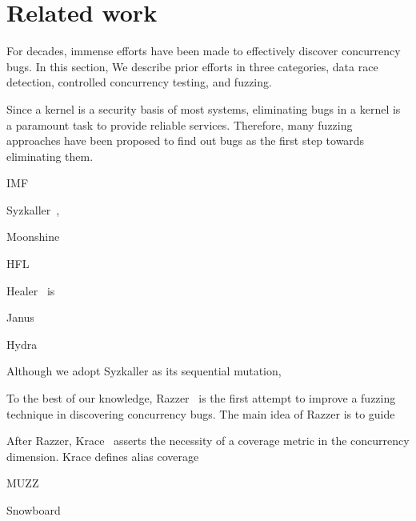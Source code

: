 \section{Related work}
\label{s:relwk}

For decades, immense efforts have been made to effectively discover
concurrency bugs. In this section, We describe prior efforts in three
categories, data race detection, controlled concurrency testing, and
fuzzing.


%

\cite{lkmm, linuxmemorymodel}


%


%
Since a kernel is a security basis of most systems, eliminating bugs
in a kernel is a paramount task to provide reliable
services. Therefore, many fuzzing approaches have been proposed to
find out bugs as the first step towards eliminating them.
%

IMF~\cite{imf}

Syzkaller~\cite{syzkaller},

Moonshine~\cite{moonshine}

HFL~\cite{hfl}

Healer~\cite{healer} is

Janus~\cite{janus}

Hydra~\cite{hydra}


Although we adopt Syzkaller as its sequential mutation, 

%
To the best of our knowledge, Razzer~\cite{razzer} is the first
attempt to improve a fuzzing technique in discovering concurrency
bugs.
%
The main idea of Razzer is to guide


After Razzer, Krace~\cite{krace} asserts the necessity of a coverage
metric in the concurrency dimension. Krace defines alias coverage


MUZZ~\cite{muzz}


Snowboard~\cite{snowboard}



